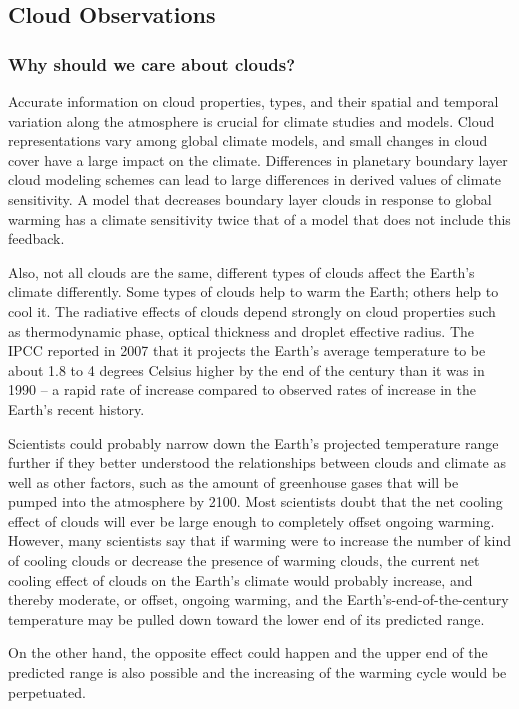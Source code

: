 \documentclass{scrartcl}
\begin{document}
\subsection{Cloud Observations}
\label{sec:org850e761}
\subsubsection{Why should we care about clouds?}
Accurate information on cloud properties, types, and their spatial and temporal
variation along the atmosphere is crucial for climate studies and models. Cloud
representations vary among global climate models, and small changes in cloud
cover have a large impact on the climate. Differences in planetary boundary
layer cloud modeling schemes can lead to large differences in derived values of
climate sensitivity. A model that decreases boundary layer clouds in response to
global warming has a climate sensitivity twice that of a model that does not
include this feedback.

Also, not all clouds are the same, different types of clouds affect the Earth’s
climate differently. Some types of clouds help to warm the Earth; others help
to cool it. The radiative effects of clouds depend strongly on cloud properties
such as thermodynamic phase, optical thickness and droplet effective radius.
The IPCC reported in 2007 that it projects the Earth’s average temperature to
be about 1.8 to 4 degrees Celsius higher by the end of the century than it was
in 1990 – a rapid rate of increase compared to observed rates of increase in
the Earth’s recent history.

Scientists could probably narrow down the Earth’s projected temperature range
 further if they better understood the relationships between clouds and climate
 as well as other factors, such as the amount of greenhouse gases that will be
 pumped into the atmosphere by 2100. Most scientists doubt that the net cooling
 effect of clouds will ever be large enough to completely offset ongoing warming.
 However, many scientists \citep{marshak} say that if warming were to increase the number
 of kind of cooling clouds or decrease the presence of warming clouds, the current net
cooling effect of clouds on the Earth’s climate would probably increase, and
thereby moderate, or offset, ongoing warming, and the Earth’s-end-of-the-century
temperature may be pulled down toward the lower end of its predicted range.

On the other hand, the opposite effect could happen and the upper end of the
predicted range is also possible and the increasing of the warming cycle would
be perpetuated.
\end{document}
